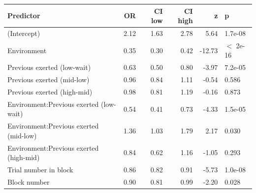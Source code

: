 \begin{table}[ht]
\centering
\begin{tabular}{lrrrrl}
  \hline
Predictor & OR & CI low & CI high & z & p \\ 
  \hline
(Intercept) & 2.12 & 1.63 & 2.78 & 5.64 & 1.7e-08 \\ 
  Environment & 0.35 & 0.30 & 0.42 & -12.73 & $<$ 2e-16 \\ 
  Previous exerted (low-wait) & 0.63 & 0.50 & 0.80 & -3.97 & 7.2e-05 \\ 
  Previous exerted (mid-low) & 0.96 & 0.84 & 1.11 & -0.54 & 0.586 \\ 
  Previous exerted (high-mid) & 0.98 & 0.81 & 1.19 & -0.16 & 0.873 \\ 
  Environment:Previous exerted (low-wait) & 0.54 & 0.41 & 0.73 & -4.33 & 1.5e-05 \\ 
  Environment:Previous exerted (mid-low) & 1.36 & 1.03 & 1.79 & 2.17 & 0.030 \\ 
  Environment:Previous exerted (high-mid) & 0.84 & 0.62 & 1.16 & -1.05 & 0.293 \\ 
  Trial number in block & 0.86 & 0.82 & 0.91 & -5.73 & 1.0e-08 \\ 
  Block number & 0.90 & 0.81 & 0.99 & -2.20 & 0.028 \\ 
   \hline
\end{tabular}
\end{table}
